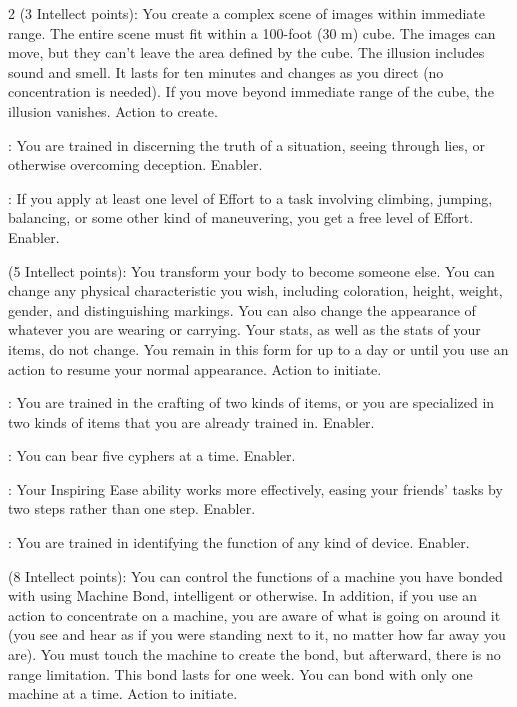 \begin{multicols}{2}
 (3 Intellect points): You create a complex scene of images within immediate range. The entire scene must fit within a
100-foot (30 m) cube. The images can move, but they can’t leave the area defined by the cube. The illusion includes sound and smell. It lasts for ten minutes and changes as you direct (no concentration is needed). If you move beyond immediate range of the cube, the illusion vanishes. Action to create. 
 
: You are trained in discerning the truth of a situation, seeing through lies, or otherwise overcoming deception. Enabler. 
 
: If you apply at least one level of Effort to a task involving climbing, jumping, balancing, or some other kind of maneuvering, you get a free level of Effort. Enabler. 
 
 (5 Intellect points): You transform your body to become someone else. You can change any physical characteristic you wish, including coloration, height, weight, gender, and distinguishing markings. You can also change the appearance of whatever you are wearing or carrying. Your stats, as well as the stats of your items, do not change. You remain in this form for up to a day or until you use an action to resume your normal appearance. Action to initiate. 
 
: You are trained in the crafting of two kinds of items, or you are specialized in two kinds of items that you are already trained in. Enabler. 
 
: You can bear five cyphers at a time. Enabler. 
 
: Your Inspiring Ease ability works more effectively, easing your friends’ tasks by two steps rather than one step. Enabler. 
 
: You are trained in identifying the function of any kind of device. Enabler. 
 
 (8 Intellect points): You can control the functions of a machine you have bonded with using Machine Bond, intelligent or otherwise. In addition, if you use an action to concentrate on a machine, you are aware of what is going on around it (you see and hear as if you were standing next to it, no matter how far away you are). You must touch the machine to create the bond, but afterward, there is no range limitation. This bond lasts for one week. You can bond with only one machine at a time. Action to initiate. 
 

\end{multicols}
